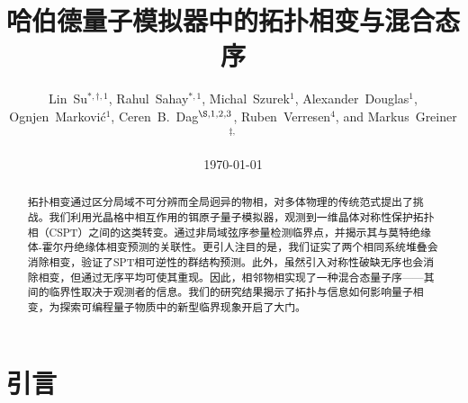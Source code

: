 \documentclass[preprint,superscriptaddress,floatfix, nofootinbib]{revtex4-2}
\begin{document}
\title{哈伯德量子模拟器中的拓扑相变与混合态序}
\author{
Lin~Su$^{*,\dagger,1}$,
Rahul~Sahay$^{*,1}$,
Michal~Szurek$^{1}$,
Alexander~Douglas$^{1}$,
Ognjen~Markovi\'{c}$^{1}$,
Ceren~B.~Dag$^{\S, 1,2,3}$,
Ruben~Verresen$^{4}$,
and Markus~Greiner$^{\ddagger,}$
}


\date{\today}
\begin{abstract}
拓扑相变通过区分局域不可分辨而全局迥异的物相，对多体物理的传统范式提出了挑战。我们利用光晶格中相互作用的铒原子量子模拟器，观测到一维晶体对称性保护拓扑相（CSPT）之间的这类转变。通过非局域弦序参量检测临界点，并揭示其与莫特绝缘体-霍尔丹绝缘体相变预测的关联性。更引人注目的是，我们证实了两个相同系统堆叠会消除相变，验证了SPT相可逆性的群结构预测。此外，虽然引入对称性破缺无序也会消除相变，但通过无序平均可使其重现。因此，相邻物相实现了一种混合态量子序——其间的临界性取决于观测者的信息。我们的研究结果揭示了拓扑与信息如何影响量子相变，为探索可编程量子物质中的新型临界现象开启了大门。
\end{abstract}

\maketitle
\section{引言}
\end{document}
